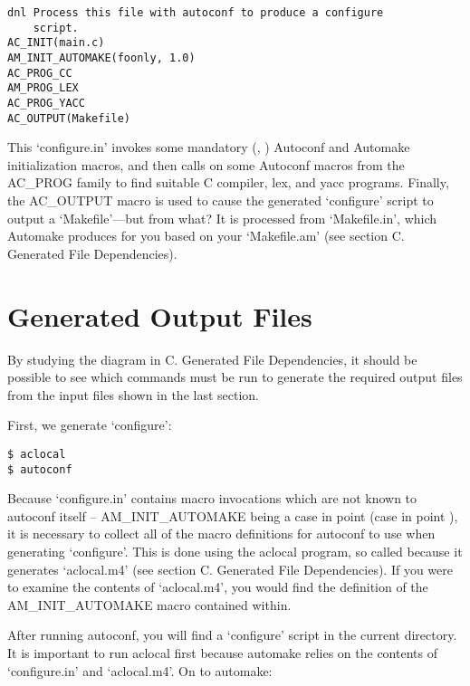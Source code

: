 \begin{Verbatim}[frame=single]
dnl Process this file with autoconf to produce a configure 
    script.
AC_INIT(main.c)
AM_INIT_AUTOMAKE(foonly, 1.0)
AC_PROG_CC
AM_PROG_LEX
AC_PROG_YACC
AC_OUTPUT(Makefile)
\end{Verbatim}

This `configure.in' invokes some mandatory ({\MbQ{}}, {\MaQ{}}) Autoconf and 
Automake 
initialization macros, and then calls on some Autoconf macros from the 
AC\_{}PROG family to find suitable C compiler, lex, and yacc programs.
Finally, the AC\_{}OUTPUT macro is used to cause the generated `configure' 
script to output a `Makefile'---but from what? It is processed 
from `Makefile.in', which Automake produces for you based on 
your `Makefile.am' (see section C. Generated File Dependencies). 


\section{Generated Output Files}\label{S_Generated_Output_Files}


By studying the diagram in C. Generated File Dependencies, it should be 
possible to see which commands must be run to generate the required 
output files from the input files shown in the last section. 


First, we generate `configure': 

\begin{Verbatim}[frame=single]
$ aclocal
$ autoconf
\end{Verbatim}

Because `configure.in' contains macro invocations which are not known to 
autoconf itself -- AM\_{}INIT\_{}AUTOMAKE being a case in point
(case in point {\MfQ{}}), it is 
necessary to collect all of the macro definitions for autoconf to use 
when generating `configure'. This is done using the
aclocal program, so 
called because it generates `aclocal.m4' (see section C. Generated File 
Dependencies). If you were to examine the contents of `aclocal.m4',
you would find the definition of the AM\_{}INIT\_{}AUTOMAKE macro 
contained within. 

After running autoconf, you will find a `configure' script in the current 
directory. It is important to run aclocal first because 
automake relies on the contents of `configure.in' and `aclocal.m4'. On to automake: 

